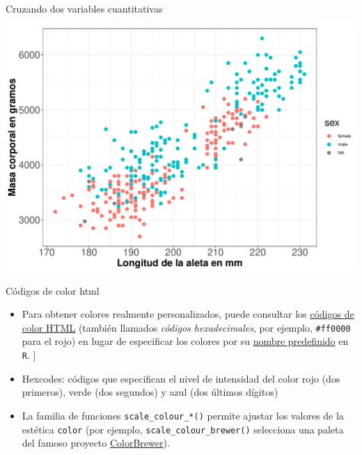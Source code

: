 \documentclass[
  ignorenonframetext,
  aspectratio=169]{beamer}
\begin{document}
\begin{frame}{Cruzando dos variables cuantitativas}
\protect\hypertarget{cruzando-dos-variables-cuantitativas-1}{}
\begin{center}\includegraphics[width=0.6\linewidth,height=0.6\textheight]{tidyverse_AD_files/figure-beamer/unnamed-chunk-139-1} \end{center}
\end{frame}

\begin{frame}[fragile]{Códigos de color html}
\protect\hypertarget{cuxf3digos-de-color-html}{}
\begin{itemize}
\item
  Para obtener colores realmente personalizados, puede consultar los
  \href{https://www.w3schools.com/colors/colors_picker.asp}{códigos de
  color HTML} (también llamados \emph{códigos hexadecimales}, por
  ejemplo, \texttt{\#ff0000} para el rojo) en lugar de especificar los
  colores por su
  \href{http://sape.inf.usi.ch/quick-reference/ggplot2/colour}{nombre
  predefinido} en \texttt{R}. {]}
\item
  Hexcodes: códigos que especifican el nivel de intensidad del color
  rojo (dos primeros), verde (dos segundos) y azul (dos últimos dígitos)
\item
  La familia de funciones \texttt{scale\_colour\_*()} permite ajustar
  los valores de la estética \texttt{color} (por ejemplo,
  \texttt{scale\_colour\_brewer()} selecciona una paleta del famoso
  proyecto
  \href{https://colorbrewer2.org/\#type=sequential\&scheme=BuGn\&n=3}{ColorBrewer}).
\end{itemize}
\end{frame}
\end{document}
